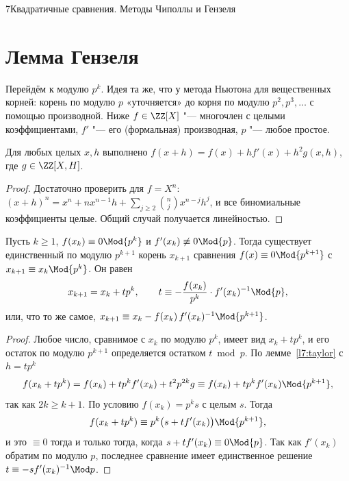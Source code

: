 \begin{lecture}{7}{Квадратичные сравнения. Методы Чиполлы и Гензеля}



\section{Лемма Гензеля}\label{l7:sec-hensel}

Перейдём к модулю $p^k$. Идея та же, что у метода Ньютона для вещественных корней: корень по
модулю $p$ «уточняется» до корня по модулю $p^2, p^3, \dots$ с помощью производной. Ниже
$f \in \ZZ[X]$ "--- многочлен с целыми коэффициентами, $f'$ "--- его (формальная) производная,
$p$ "--- любое простое.

\begin{lemma}\label{l7:taylor}
Для любых целых $x, h$ выполнено $f(x + h) = f(x) + h f'(x) + h^2 g(x, h)$, где
$g \in \ZZ[X, H]$.
\end{lemma}

\begin{proof}
Достаточно проверить для $f = X^n$: $(x + h)^n = x^n + n x^{n-1} h + \sum_{j \ge 2}
\binom{n}{j} x^{n-j} h^j$, и все биномиальные коэффициенты целые. Общий случай получается
линейностью.
\end{proof}

\begin{theorem}\label{l7:hensel}
Пусть $k \ge 1$, $f(x_k) \equiv 0 \Mod{p^k}$ и $f'(x_k) \not\equiv 0 \Mod{p}$. Тогда существует
единственный по модулю $p^{k+1}$ корень $x_{k+1}$ сравнения $f(x) \equiv 0 \Mod{p^{k+1}}$ с
$x_{k+1} \equiv x_k \Mod{p^k}$. Он равен
\[
  x_{k+1} = x_k + t p^k, \qquad t \equiv -\frac{f(x_k)}{p^k} \cdot f'(x_k)^{-1} \Mod{p},
\]
или, что то же самое, $x_{k+1} \equiv x_k - f(x_k)\, f'(x_k)^{-1} \Mod{p^{k+1}}$.
\end{theorem}

\begin{proof}
Любое число, сравнимое с $x_k$ по модулю $p^k$, имеет вид $x_k + tp^k$, и его остаток по модулю
$p^{k+1}$ определяется остатком $t \bmod p$. По лемме~\ref{l7:taylor} с $h = tp^k$
\[
  f(x_k + tp^k) = f(x_k) + t p^k f'(x_k) + t^2 p^{2k} g \equiv f(x_k) + t p^k f'(x_k)
  \Mod{p^{k+1}},
\]
так как $2k \ge k + 1$. По условию $f(x_k) = p^k s$ с целым $s$. Тогда
\[
  f(x_k + tp^k) \equiv p^k \bigl(s + t f'(x_k)\bigr) \Mod{p^{k+1}},
\]
и это $\equiv 0$ тогда и только тогда, когда $s + t f'(x_k) \equiv 0 \Mod{p}$. Так как
$f'(x_k)$ обратим по модулю $p$, последнее сравнение имеет единственное решение
$t \equiv -s f'(x_k)^{-1} \Mod p$.


\end{proof}
\end{lecture}
